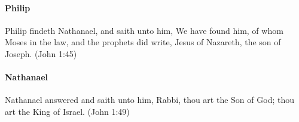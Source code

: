 \paragraph{Philip}
Philip findeth Nathanael, and saith unto him, We have found him, of whom Moses in the law, and the prophets did write, Jesus of Nazareth, the son of Joseph. (John 1:45)

\paragraph{Nathanael}
Nathanael answered and saith unto him, Rabbi, thou art the Son of God; thou art the King of Israel. (John 1:49)
